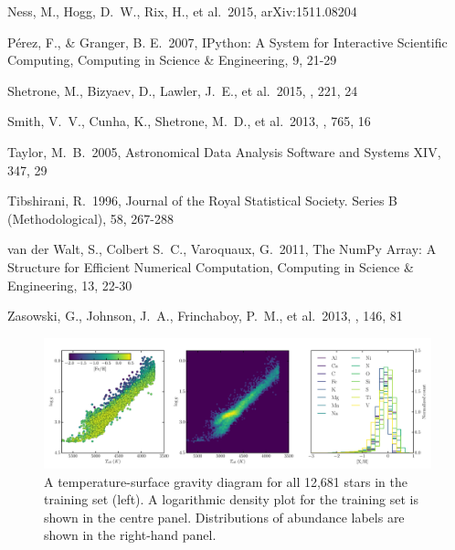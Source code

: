 \documentclass[12pt,preprint]{aastex6}
\begin{document}
\begin{thebibliography}{dummy}
 Ness, M., Hogg, D.~W., 
Rix, H., et al.\ 2015, arXiv:1511.08204 

 P\'erez, F., \& Granger, B. E.\ 2007, IPython: A System for Interactive Scientific Computing, Computing in Science \& Engineering, 9, 21-29

 Shetrone, M., Bizyaev, 
D., Lawler, J.~E., et al.\ 2015, \apjs, 221, 24 

 Smith, V.~V., Cunha, K., 
Shetrone, M.~D., et al.\ 2013, \apj, 765, 16 

 Taylor, M.~B.\ 2005, Astronomical Data Analysis Software and Systems XIV, 347, 29 

 Tibshirani, R.\ 1996, Journal of the Royal Statistical Society. Series B (Methodological), 58, 267-288

 van der Walt, S., Colbert S.~C., Varoquaux, G.\ 2011, The NumPy Array: A Structure for Efficient Numerical Computation, Computing in Science \& Engineering, 13, 22-30

 Zasowski, G., Johnson, 
J.~A., Frinchaboy, P.~M., et al.\ 2013, \aj, 146, 81 


\end{thebibliography}

\clearpage

\begin{figure}[p]
\centering
\includegraphics[width=\textwidth]{training_set_hrd.pdf}
\caption{A temperature-surface gravity diagram for all 12,681 stars in
the training set (left). A logarithmic density plot for the training set
is shown in the centre panel. Distributions of abundance labels
are shown in the right-hand panel.\label{fig:training_set_hrd}}
\end{figure}

\clearpage
\end{document}

